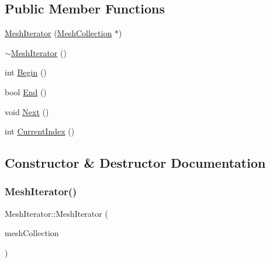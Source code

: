 \subsection*{Public Member Functions}
\begin{DoxyCompactItemize}
\item 
\mbox{\hyperlink{class_mesh_iterator_a4c2d4c9e8647ae8fab989b3be1ce9534}{Mesh\+Iterator}} (\mbox{\hyperlink{class_mesh_collection}{Mesh\+Collection}} $\ast$)
\item 
\mbox{\hyperlink{class_mesh_iterator_a9863c2947ad6433a4da4be9efe7f287d}{$\sim$\+Mesh\+Iterator}} ()
\item 
int \mbox{\hyperlink{class_mesh_iterator_a07a9e1405ac4297b6300875b9084d946}{Begin}} ()
\item 
bool \mbox{\hyperlink{class_mesh_iterator_aab37f952147b0b24bd22e469f23605fd}{End}} ()
\item 
void \mbox{\hyperlink{class_mesh_iterator_ab680a0183b6365f5ec200be9dbce011b}{Next}} ()
\item 
int \mbox{\hyperlink{class_mesh_iterator_a72853e5e422c2e0bdb1fc084d7fb5118}{Current\+Index}} ()
\end{DoxyCompactItemize}


\subsection{Constructor \& Destructor Documentation}
\mbox{\label{class_mesh_iterator_a4c2d4c9e8647ae8fab989b3be1ce9534}} 
\subsubsection{\texorpdfstring{MeshIterator()}{MeshIterator()}}
{\footnotesize\ttfamily Mesh\+Iterator\+::\+Mesh\+Iterator (\begin{DoxyParamCaption}\item[{\mbox{\hyperlink{class_mesh_collection}{Mesh\+Collection}} $\ast$}]{mesh\+Collection }\end{DoxyParamCaption})\hspace{0.3cm}{\ttfamily [explicit]}}

\mbox{\label{class_mesh_iterator_a9863c2947ad6433a4da4be9efe7f287d}} 
